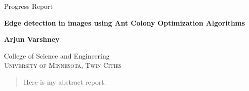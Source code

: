 \documentclass[12pt,a4paper]{report}
\begin{document}
\fancypage{\setlength{\fboxsep}{10pt}\doublebox}{}
\renewcommand\bibname{References} 

\begin{titlepage}
\begin{center}
\textup{\large Progress Report}\\[1.0cm]

\begin{LARGE}{\textbf {Edge detection in images using Ant Colony Optimization Algorithms}}\end{LARGE}

\vfill
\begin{large}\textbf{Arjun Varshney}\\\end{large}
\vfill

\LARGE{College of Science and Engineering}\\
\normalsize
\textsc{University of Minnesota, Twin Cities}\\
\vspace{0.5cm}
\end{center}
\end{titlepage}

\begin{abstract}
Here is my abstract report.
\end{abstract}

\newpage
\tableofcontents
\listoffigures

\newpage
\end{document}
